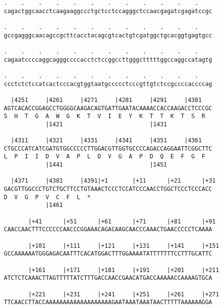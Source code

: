 \documentclass{article}
\begin{document}
\begin{Verbatim}
.    .    .    .    .    .    .    .    .    .    .    .    
cagactggcaacctcaagaaggccctgctcctccagggctccaacgagatcgagatccgc
                                                            
.    .    .    .    .    .    .    .    .    .    .    .    
gccgagggcaacagccgcttcacctacagcgtcactgtcgatggctgcacggtgagtgcc
                                                            
.    .    .    .    .    .    .    .    .    .    .    .    
cagaatccccaggcagggccccacctctccggccttgggctttttggccaggccatagtg
                                                            
.    .    .    .    .    .    .    .    .    .    .    .    
ccctctctccatcactcccacgtggtaatgccccctcccgttgtctccgccccaccccag
                                                            
  |4251     |4261     |4271     |4281     |4291     |4301   
AGTCACACCGGAGCCTGGGGCAAGACAGTGATTGAATACAAAACCACCAAGACCTCCCGC
S  H  T  G  A  W  G  K  T  V  I  E  Y  K  T  T  K  T  S  R  
            |1421                         |1431             
  
  |4311     |4321     |4331     |4341     |4351     |4361   
CTGCCCATCATCGATGTGGCCCCCTTGGACGTTGGTGCCCCAGACCAGGAATTCGGCTTC
L  P  I  I  D  V  A  P  L  D  V  G  A  P  D  Q  E  F  G  F  
            |1441                         |1451             
  
  |4371     |4381     |4391|+1       |+11      |+21      |+31
GACGTTGGCCCTGTCTGCTTCCTGTAAACTCCCTCCATCCCAACCTGGCTCCCTCCCACC
D  V  G  P  V  C  F  L  *   
            |1461                                           
  
       |+41      |+51      |+61      |+71      |+81      |+91
CAACCAACTTTCCCCCCAACCCGGAAACAGACAAGCAACCCAAACTGAACCCCCTCAAAA
                                                            
       |+101     |+111     |+121     |+131     |+141     |+151
GCCAAAAAATGGGAGACAATTTCACATGGACTTTGGAAAATATTTTTTTCCTTTGCATTC
                                                            
       |+161     |+171     |+181     |+191     |+201     |+211
ATCTCTCAAACTTAGTTTTTATCTTTGACCAACCGAACATGACCAAAAACCAAAAGTGCA
                                                            
       |+221     |+231     |+241     |+251     |+261     |+271
TTCAACCTTACCAAAAAAAAAAAAAAAAAAAGAATAAATAAATAACTTTTTAAAAAAGGA
                                                            

\end{Verbatim}
\end{document}
